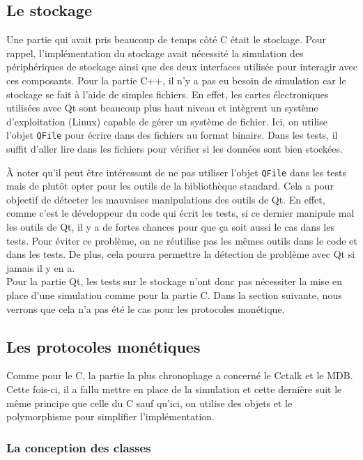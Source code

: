 \documentclass[a4paper]{article}
\begin{document}
\subsection{Le stockage}

Une partie qui avait pris beaucoup de temps côté C était le stockage. Pour
rappel, l'implémentation du stockage avait nécessité la simulation des
périphériques de stockage ainsi que des deux interfaces utilisée pour interagir
avec ces composants. Pour la partie C++, il n'y a pas eu besoin de simulation car
le stockage se fait à l'aide de simples fichiers. En effet, les cartes
électroniques utilisées avec Qt sont beaucoup plus haut niveau et intègrent un
système d'exploitation (Linux) capable de gérer un système de fichier. Ici, on
utilise l'objet \verb|QFile| pour écrire dans des fichiers au format binaire.
Dans les tests, il suffit d'aller lire dans les fichiers pour vérifier si les données
sont bien stockées.

À noter qu'il peut être intéressant de ne pas utiliser l'objet \verb|QFile|
dans les tests mais de plutôt opter pour les outils de la bibliothèque
standard. Cela a pour objectif de détecter les mauvaises manipulations des
outils de Qt. En effet, comme c'est le développeur du code qui écrit les tests,
si ce dernier manipule mal les outils de Qt, il y a de fortes chances pour que ça
soit aussi le cas dans les tests. Pour éviter ce problème, on ne réutilise pas
les mêmes outils dans le code et dans les tests. De plus, cela pourra permettre
la détection de problème avec Qt si jamais il y en a.\\

Pour la partie Qt, les tests sur le stockage n'ont donc pas nécessiter la mise
en place d'une simulation comme pour la partie C. Dans la section suivante, nous
verrons que cela n'a pas été le cas pour les protocoles monétique.

\subsection{Les protocoles monétiques}

Comme pour le C, la partie la plus chronophage a concerné le Cctalk et le MDB.
Cette fois-ci, il a fallu mettre en place de la simulation et cette dernière
suit le même principe que celle du C sauf qu'ici, on utilise des objets et le
polymorphisme pour simplifier l'implémentation.

\subsubsection{La conception des classes}
\end{document}
